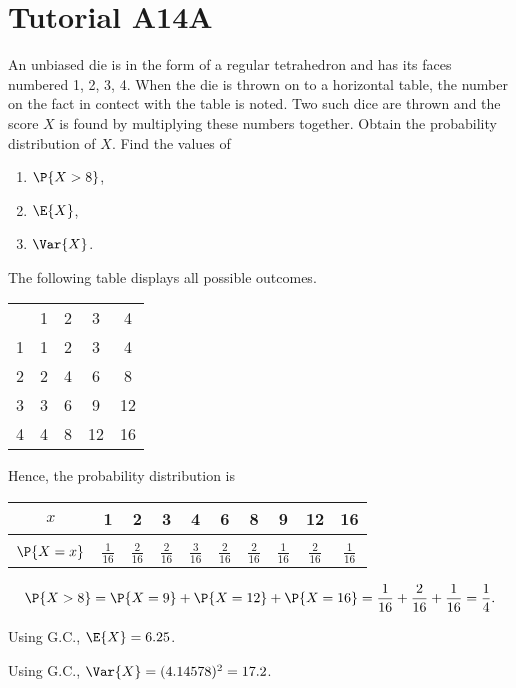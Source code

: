 \section{Tutorial A14A}

\begin{problem}
    An unbiased die is in the form of a regular tetrahedron and has its faces numbered 1, 2, 3, 4. When the die is thrown on to a horizontal table, the number on the fact in contect with the table is noted. Two such dice are thrown and the score $X$ is found by multiplying these numbers together. Obtain the probability distribution of $X$. Find the values of
    \begin{enumerate}
        \item $\P{X > 8}$,
        \item $\E{X}$,
        \item $\Var{X}$.
    \end{enumerate}
\end{problem}
\begin{solution}
    The following table displays all possible outcomes.
    \begin{table}[H]
        \centering
        \begin{tabular}{ccccc}
        & 1 & 2 & 3  & 4  \\ \cline{2-5} 
        \multicolumn{1}{c|}{1} & 1 & 2 & 3  & 4  \\
        \multicolumn{1}{c|}{2} & 2 & 4 & 6  & 8  \\
        \multicolumn{1}{c|}{3} & 3 & 6 & 9  & 12 \\
        \multicolumn{1}{c|}{4} & 4 & 8 & 12 & 16
        \end{tabular}
    \end{table}
    Hence, the probability distribution is
    \begin{table}[H]
        \centering
        \begin{tabular}{|c|c|c|c|c|c|c|c|c|c|}
        \hline
        $x$ & 1 & 2 & 3 & 4 & 6 & 8 & 9 & 12 & 16 \\ \hline
        &&&&&&&&&\\[-1em]
        $\P{X = x}$ & $\frac1{16}$ & $\frac2{16}$ & $\frac2{16}$ & $\frac3{16}$ & $\frac2{16}$ & $\frac2{16}$ & $\frac1{16}$ & $\frac2{16}$ & $\frac1{16}$ \\[0.2em] \hline
        \end{tabular}
    \end{table}

    \begin{ppart}
        \[\P{X > 8} = \P{X = 9} + \P{X = 12} + \P{X = 16} = \frac1{16} + \frac2{16} + \frac1{16} = \frac14.\]
    \end{ppart}
    \begin{ppart}
        Using G.C., $\E{X} = 6.25$.
    \end{ppart}
    \begin{ppart}
        Using G.C., $\Var{X} = (4.14578)^2 = 17.2$.
    \end{ppart}
\end{solution}

